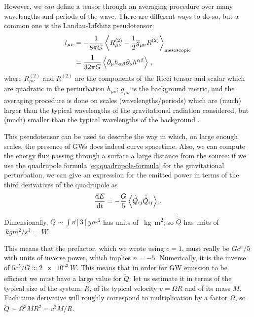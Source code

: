 \documentclass[main.tex]{subfiles}
\begin{document}
However, we \emph{can} define a tensor through an averaging procedure over many wavelengths and periods of the wave. There are different ways to do so, but a common one is the Landau-Lifshitz pseudotensor: 
%
\begin{align}
t_{\mu \nu } &= - \frac{1}{8 \pi G} \expval{R^{(2)}_{\mu \nu }- \frac{1}{2} \overline{g}_{\mu \nu } R^{(2)}}_{\text{mesoscopic}}  \\
&= \frac{1}{32 \pi G} \expval{\partial_{\mu } h_{\alpha \beta } \partial_{\nu }h^{\alpha \beta }}
\,,
\end{align}
%
where \(R^{(2)}_{\mu \nu }\) and \(R^{(2)}\) are the components of the Ricci tensor and scalar which are quadratic in the perturbation \(h_{\mu \nu }\); \(\overline{g}_{\mu \nu }\) is the background metric, and the averaging procedure is done on scales (wavelengths/periods) which are (much) larger than the typical wavelengths of the gravitational radiation considered, but (much) smaller than the typical wavelengths of the background \cite[sections 1.4.2, 1.4.3]{maggioreGravitationalWavesVolume2007}.

This pseudotensor can be used to describe the way in which, on large enough scales, the presence of \acsp{GW} does indeed curve spacetime.
Also, we can compute the energy flux passing through a surface a large distance from the source: if we use the quadrupole formula \eqref{eq:quadrupole-formula} for the gravitational perturbation, we can give an expression for the emitted power in terms of the third derivatives of the quadrupole as \cite[eq.\ 3.98]{maggioreGravitationalWavesVolume2007} 
%
\begin{align} \label{eq:energy-emission-quadrupole}
\dv{E}{t} = -\frac{G}{5} \expval{ \dot{\ddot{Q}}_{ij} \dot{\ddot{Q}}_{ij}}
\,.
\end{align}

Dimensionally, \(Q \sim \int \dd[3]{y} \rho r^2\) has units of \SI{}{kg m^2}; so \(\dot{\ddot{Q}}\) has units of \(\SI{}{kg m^2 / s^3} = \SI{}{W}\).

This means that the prefactor, which we wrote using \(c=1\), must really be \(G c^{n}/5\) with units of inverse power, which implies \(n = -5\).
Numerically, it is the inverse of \(5c^{5} / G \approx \SI{2e53}{W}\). 
This means that in order for \ac{GW} emission to be efficient we must have a large value for \(\dot{\ddot{Q}}\): let us estimate it in terms of the typical size of the system, \(R\), of its typical velocity \(v = \Omega R\) and of its mass \(M\). 
Each time derivative will roughly correspond to multiplication by a factor \(\Omega \), so \(\dot{\ddot{Q}} \sim \Omega^3 M R^2 = v^3 M / R\).
\end{document}
